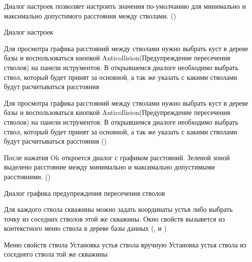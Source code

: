 Диалог настроек позволяет настроить значения по-умолчанию для минимально и максимально допустимого расстояния между стволами.
()

{Диалог настроек}

Для просмотра графика расстояний между стволами нужно выбрать куст в дереве базы и воспользоваться кнопкой Anticollision(Предупреждение пересечения стволов) на панели иструментов.
В открывшемся диалоге необходимо выбрать ствол, который будет принят за основной, а так же указать с какими стволами будут расчитываться расстояния

Для просмотра графика расстояний между стволами нужно выбрать куст в дереве базы и воспользоваться кнопкой Anticollision(Предупреждение пересечения стволов) на панели иструментов.
В открывшемся диалоге необходимо выбрать ствол, который будет принят за основной, а так же указать с какими стволами будут расчитываться расстояния
()


После нажатия Ok откроется диалог с графиком расстояний. Зеленой зоной выделено расстояние между минимально и максимально допустимыми расстояними.
()

{Диалог графика предупреждения пересечения стволов}

Для каждого ствола скважины можно задать координаты устья либо выбрать точку из соседних стволов этой же скважины. Окно свойств вызывется из контекстного меню ствола в дереве базы данных
(,  и )

{Меню свойств ствола}
{Установка устья ствола вручную}
{Установка устья ствола из соседнего ствола той же скважины}
